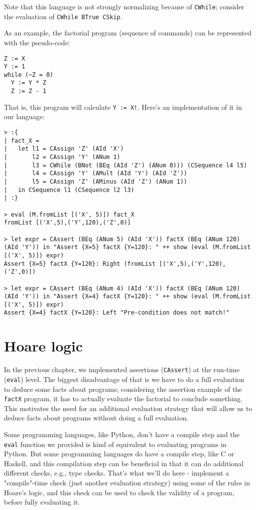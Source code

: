 \documentclass{article}
\theoremstyle{definition}
\begin{document}
Note that this language is not strongly normalizing because of \texttt{CWhile}; consider the evaluation of \texttt{CWhile BTrue CSkip}.

As an example, the factorial program (sequence of commands) can be represented with the pseudo-code:

\begin{lstlisting}
Z := X
Y := 1
while (~Z = 0)
  Y := Y * Z
  Z := Z - 1
\end{lstlisting}

That is, this program will calculate \texttt{Y := X!}. Here's an implementation of it in our language:

\begin{lstlisting}
> :{
| fact_X =
|   let l1 = CAssign 'Z' (AId 'X')
|       l2 = CAssign 'Y' (ANum 1)
|       l3 = CWhile (BNot (BEq (AId 'Z') (ANum 0))) (CSequence l4 l5)
|       l4 = CAssign 'Y' (AMult (AId 'Y') (AId 'Z'))
|       l5 = CAssign 'Z' (AMinus (AId 'Z') (ANum 1))
|   in CSequence l1 (CSequence l2 l3)
| :}

> eval (M.fromList [('X', 5)]) fact_X
fromList [('X',5),('Y',120),('Z',0)]

> let expr = CAssert (BEq (ANum 5) (AId 'X')) factX (BEq (ANum 120) (AId 'Y')) in "Assert {X=5} factX {Y=120}: " ++ show (eval (M.fromList [('X', 5)]) expr)
Assert {X=5} factX {Y=120}: Right (fromList [('X',5),('Y',120),('Z',0)])

> let expr = CAssert (BEq (ANum 4) (AId 'X')) factX (BEq (ANum 120) (AId 'Y')) in "Assert {X=4} factX {Y=120}: " ++ show (eval (M.fromList [('X', 5)]) expr)
Assert {X=4} factX {Y=120}: Left "Pre-condition does not match!"
\end{lstlisting}

\section{Hoare logic}

In the previous chapter, we implemented assertions (\texttt{CAssert}) at the run-time (\texttt{eval}) level. The biggest disadvantage of that is we have to do a full evaluation to deduce some facts about programs; considering the assertion example of the \texttt{factX} program, it has to actually evaluate the factorial to conclude something. This motivates the need for an additional evaluation strategy that will allow us to deduce facts about programs without doing a full evaluation.

Some programming languages, like Python, don't have a compile step and the \texttt{eval} function we provided is kind of equivalent to evaluating programs in Python. But some programming languages do have a compile step, like C or Haskell, and this compilation step can be beneficial in that it can do additional different checks, e.g., type checks. That's what we'll do here - implement a "compile"-time check (just another evaluation strategy) using some of the rules in Hoare's logic, and this check can be used to check the validity of a program, before fully evaluating it.
\end{document}
